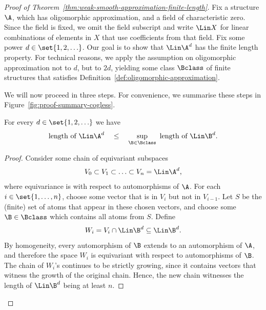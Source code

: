 \begin{proof}
    [Proof of Theorem~\ref{thm:weak-smooth-approximation-finite-length}]
Fix a structure $\A$, which has oligomorphic approximation, and  a field of characteristic zero. 
Since the field is fixed, we omit the field subscript and write $\Lin X$ for linear combinations of elements in $X$ that use coefficients from that field. Fix some power $d \in \set{1,2,\ldots}$.  Our goal is to show that 
$
\Lin \A^d
$
 has  the finite length property. For technical reasons, we apply the assumption on oligomorphic approximation not to $d$, but to $2d$, yielding  some class $\Bclass$ of finite structures that satisfies Definition~\ref{def:oligomorphic-approximation}.

We will now proceed in three steps. 
For convenience, we summarise these steps in Figure~\ref{fig:proof-summary-cogless}. 
    \begin{lemma}\label{lem:reduce-to-finite-substructures}
        For every $d \in \set{1,2,\ldots}$ we have 
        \begin{align*}
        \text{length of }\Lin \A^d
        \quad \leq \quad  \sup_{\B \in \Bclass} \text{\ length of }\Lin \B^d.
        \end{align*}
    \end{lemma}
    \begin{proof}
        Consider some chain of equivariant subspaces 
        \begin{align*}
        V_0 \subset V_1 \subset \ldots \subset V_n = \Lin \A^d,
        \end{align*}
        where equivariance is with respect to automorphisms of $\A$. 
        For each $i \in \set{1,\ldots,n}$, choose some vector  that is in $V_i$ but not in $V_{i-1}$. Let $S$ be the (finite) set of atoms that appear in these chosen vectors, and choose some $\B \in \Bclass$ which contains all atoms from $S$. Define  
        \begin{align*}
        W_i = V_i \cap \Lin \B^d \subseteq \Lin \B^d.
        \end{align*}
        By homogeneity, every automorphism of $\B$ extends to an automorphism of $\A$, and therefore the space $W_i$ is  equivariant with respect to automorphisms of $\B$.  The chain of $W_i$'s continues to be strictly growing, since it contains vectors that witness the growth of the original chain. Hence, the new chain  witnesses the length of $\Lin \B^d$ being at least $n$. 
    \end{proof}



\end{proof}
